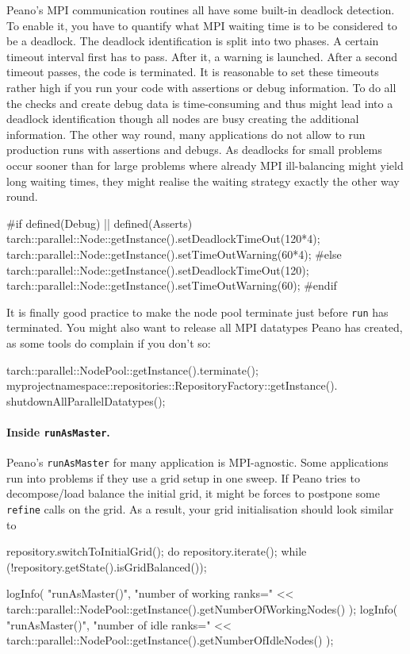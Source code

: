 \noindent
Peano's MPI communication routines all have some built-in deadlock detection. 
To enable it, you have to quantify what MPI waiting time is to be considered to
be a deadlock.
The deadlock identification is split into two phases.
A certain timeout interval first has to pass.
After it, a warning is launched. 
After a second timeout passes, the code is terminated.
It is reasonable to set these timeouts rather high if you run your code with
assertions or debug information.
To do all the checks and create debug data is time-consuming and thus might lead
into a deadlock identification though all nodes are busy creating the additional
information.
The other way round, many applications do not allow to run production runs with
assertions and debugs.
As deadlocks for small problems occur sooner than for large problems where
already MPI ill-balancing might yield long waiting times, they might realise the
waiting strategy exactly the other way round.

\begin{code}
  #if defined(Debug) || defined(Asserts)
  tarch::parallel::Node::getInstance().setDeadlockTimeOut(120*4);
  tarch::parallel::Node::getInstance().setTimeOutWarning(60*4);
  #else
  tarch::parallel::Node::getInstance().setDeadlockTimeOut(120);
  tarch::parallel::Node::getInstance().setTimeOutWarning(60);
  #endif
\end{code}

\noindent
It is finally good practice to make the node pool terminate just before
\texttt{run} has terminated.
You might also want to release all MPI datatypes Peano has created, as some
tools do complain if you don't so:

\begin{code}
tarch::parallel::NodePool::getInstance().terminate();
myprojectnamespace::repositories::RepositoryFactory::getInstance().
  shutdownAllParallelDatatypes();
\end{code}



\paragraph{Inside \texttt{runAsMaster}.}
Peano's \texttt{runAsMaster} for many application is MPI-agnostic.
Some applications run into problems if they use a grid setup in one sweep.
If Peano tries to decompose/load balance the initial grid, it might be forces to
postpone some \texttt{refine} calls on the grid. 
As a result, your grid initialisation should look similar to
\begin{code}
repository.switchToInitialGrid();
do {
  repository.iterate();
} while (!repository.getState().isGridBalanced());

logInfo(
  "runAsMaster()",
  "number of working ranks=" << 
  tarch::parallel::NodePool::getInstance().getNumberOfWorkingNodes() 
);
logInfo(
  "runAsMaster()",
  "number of idle ranks=" << tarch::parallel::NodePool::getInstance().getNumberOfIdleNodes()
);

\end{code}

